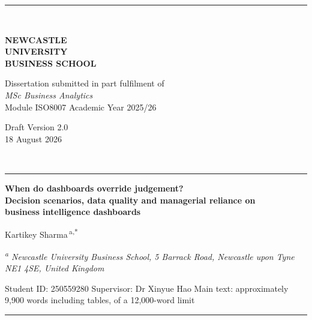 \documentclass[11pt,a4paper]{article}
\numberwithin{figure}{section}
\numberwithin{table}{section}
\begin{document}
\thispagestyle{empty}
\begin{center}
\rule{\textwidth}{0.8pt}\\[3pt]
\begin{minipage}{0.30\textwidth}\centering
{\footnotesize\sffamily\textbf{NEWCASTLE}\\\textbf{UNIVERSITY}\\\textbf{BUSINESS SCHOOL}}
\end{minipage}%
\begin{minipage}{0.44\textwidth}\centering
{\footnotesize Dissertation submitted in part fulfilment of}\\[2pt]
{\large\itshape MSc Business Analytics}\\[3pt]
{\footnotesize Module ISO8007 \textbullet{} Academic Year 2025/26}
\end{minipage}%
\begin{minipage}{0.24\textwidth}\centering
{\footnotesize Draft Version 2.0\\ 18 August 2026}
\end{minipage}\\[3pt]
\rule{\textwidth}{0.8pt}
\end{center}

\vspace{10pt}
{\LARGE\bfseries When do dashboards override judgement?\\[3pt]
Decision scenarios, data quality and managerial reliance on\\[3pt] business intelligence dashboards\par}

\vspace{10pt}
{\large Kartikey Sharma\,\textsuperscript{a,*}\par}
\vspace{3pt}
{\footnotesize\itshape \textsuperscript{a} Newcastle University Business School, 5 Barrack Road, Newcastle upon Tyne NE1 4SE, United Kingdom\par}
\vspace{2pt}
{\footnotesize Student ID: 250559280 \quad\textbullet\quad Supervisor: Dr Xinyue Hao \quad\textbullet\quad Main text: approximately 9,900 words including tables, of a 12,000-word limit\par}

\vspace{12pt}
\rule{\textwidth}{0.5pt}
\vspace{6pt}
\end{document}
